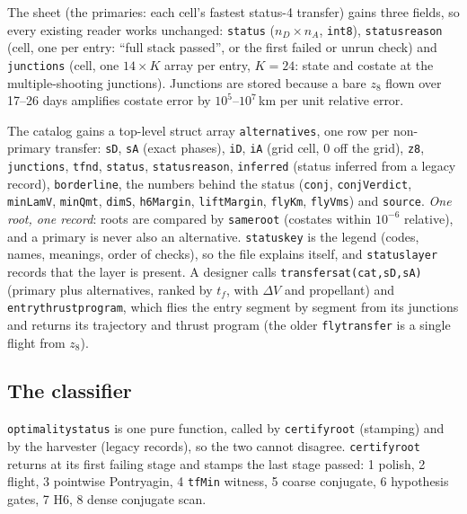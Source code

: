 \documentclass[11pt]{article}
\renewcommand{\_}{\textunderscore\allowbreak}
\newcommand{\code}[1]{\texttt{#1}}
\begin{document}
\noindent The sheet (the primaries: each cell's fastest status-4 transfer)
gains three fields, so every existing reader works unchanged:
\code{status} ($n_D\times n_A$, \code{int8}), \code{status\_reason}
(cell, one per entry: ``full stack passed'', or the first failed or unrun
check) and \code{junctions} (cell, one $14\times K$ array per entry, $K=24$:
state and costate at the multiple-shooting junctions). Junctions are stored
because a bare $z_8$ flown over 17--26 days amplifies costate error by
$10^{5}$--$10^{7}$\,km per unit relative error.

The catalog gains a top-level struct array \code{alternatives}, one row per
non-primary transfer: \code{sD}, \code{sA} (exact phases), \code{iD},
\code{iA} (grid cell, 0 off the grid), \code{z8}, \code{junctions},
\code{tf\_nd}, \code{status}, \code{status\_reason}, \code{inferred} (status
inferred from a legacy record), \code{borderline}, the numbers behind the
status (\code{conj}, \code{conjVerdict}, \code{minLamV}, \code{minQmt},
\code{dimS}, \code{h6Margin}, \code{liftMargin}, \code{flyKm},
\code{flyVms}) and \code{source}. \emph{One root, one record}: roots are
compared by \code{same\_root} (costates within $10^{-6}$ relative), and a
primary is never also an alternative. \code{status\_key} is the legend
(codes, names, meanings, order of checks), so the file explains itself, and
\code{status\_layer} records that the layer is present. A designer calls
\code{transfers\_at(cat,sD,sA)} (primary plus alternatives, ranked by $t_f$,
with $\Delta V$ and propellant) and \code{entry\_thrust\_program}, which flies
the entry segment by segment from its junctions and returns its trajectory and
thrust program (the older \code{fly\_transfer} is a single flight from $z_8$).

\subsection{The classifier}

\code{optimality\_status} is one pure function, called by
\code{certify\_root} (stamping) and by the harvester (legacy records), so the
two cannot disagree. \code{certify\_root} returns at its first failing stage
and stamps the last stage passed: 1 polish, 2 flight, 3 pointwise
Pontryagin, 4 \code{tfMin} witness, 5 coarse conjugate, 6 hypothesis gates,
7 H6, 8 dense conjugate scan.
\end{document}
